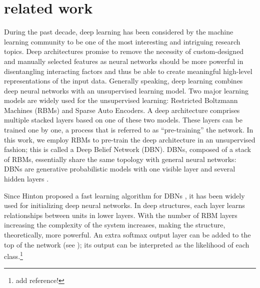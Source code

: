 \documentclass{article}
\begin{document}
%


\section{related work}
During the past decade, deep learning has been considered by the machine learning community to be one of the most interesting and intriguing research topics. Deep architectures promise to remove the necessity of custom-designed and manually selected features as neural networks should be more powerful in disentangling interacting factors and thus be able to create meaningful high-level representations of the input data. Generally speaking, deep learning combines deep neural networks with an unsupervised learning model. Two major learning models are widely used for the unsupervised learning: Restricted Boltzmann Machines (RBMs) and Sparse Auto Encoders. A deep architecture comprises multiple stacked layers based on one of these two models. These layers can be trained one by one, a process that is referred to as ``pre-training'' the network. In this work, we employ RBMs to pre-train the deep architecture in an unsupervised fashion; this is called a Deep Belief Network (DBN). DBNs, composed of a stack of RBMs, essentially share the same topology with general neural networks: DBNs are generative probabilistic models with one visible layer and several hidden layers \cite{hinton2006fast}. 

Since Hinton proposed a fast learning algorithm for DBNs \cite{hinton2006fast}, it has been widely used for initializing deep neural networks. In deep structures, each layer learns relationships between units in lower layers. With the number of RBM layers increasing the complexity of the system increases, making the structure, theoretically, more powerful. An extra softmax output layer can be added to the top of the network (see ); its output can be interpreted as the likelihood of each class.\footnote{add reference!}
\end{document}
